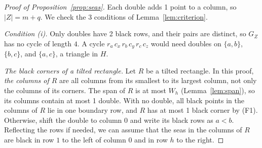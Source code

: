 \begin{proof}[Proof of Proposition~\ref{prop:seas}]
Each double adds 1 point to a column, so $|Z|=m+q$. We check the 3 conditions of
Lemma~\ref{lem:criterion}.

\emph{Condition (i).} Only doubles have 2 black rows, and their pairs are distinct, so
$G_Z$ has no cycle of length $4$. A cycle $r_a\,c_x\,r_b\,c_y\,r_c\,c_z$ would need doubles
on $\{a,b\}$, $\{b,c\}$, and $\{a,c\}$, a triangle in $H$.

\emph{The black corners of a tilted rectangle.} Let $R$ be a tilted rectangle. In this
proof, \emph{the columns of $R$} are all columns from its smallest to its largest column,
not only the columns of its corners. The span of $R$ is at most $W_h$
(Lemma~\ref{lem:span}), so its columns contain at most 1 double. With no
double, all black points in the columns of $R$ lie in one boundary row, and $R$ has at most
1 black corner by (F1). Otherwise, shift the double to column $0$ and write its black rows as
$a<b$. Reflecting the rows if needed, we can assume that the seas in the columns of $R$ are
black in row $1$ to the left of column $0$ and in row $h$ to the right.


\end{proof}
